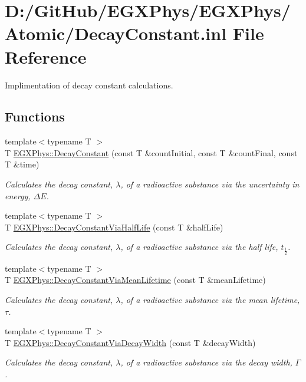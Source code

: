 \hypertarget{_decay_constant_8inl}{}\section{D\+:/\+Git\+Hub/\+E\+G\+X\+Phys/\+E\+G\+X\+Phys/\+Atomic/\+Decay\+Constant.inl File Reference}
\label{_decay_constant_8inl}


Implimentation of decay constant calculations.  


\subsection*{Functions}
\begin{DoxyCompactItemize}
\item 
{\footnotesize template$<$typename T $>$ }\\T \mbox{\hyperlink{group___e_g_x_phys-_decay_constant_ga904edce5aad441b4a0873b3b1a83c7f2}{E\+G\+X\+Phys\+::\+Decay\+Constant}} (const T \&count\+Initial, const T \&count\+Final, const T \&time)
\begin{DoxyCompactList}\small\item\em Calculates the decay constant, $\lambda$, of a radioactive substance via the uncertainty in energy, $\Delta E$. \end{DoxyCompactList}\item 
{\footnotesize template$<$typename T $>$ }\\T \mbox{\hyperlink{group___e_g_x_phys-_decay_constant_ga89c04a655d9e24f976399cc8f173b7aa}{E\+G\+X\+Phys\+::\+Decay\+Constant\+Via\+Half\+Life}} (const T \&half\+Life)
\begin{DoxyCompactList}\small\item\em Calculates the decay constant, $\lambda$, of a radioactive substance via the half life, $t_{\frac{1}{2}}$. \end{DoxyCompactList}\item 
{\footnotesize template$<$typename T $>$ }\\T \mbox{\hyperlink{group___e_g_x_phys-_decay_constant_ga260cf6dc4f926269ea8966c19dfd269f}{E\+G\+X\+Phys\+::\+Decay\+Constant\+Via\+Mean\+Lifetime}} (const T \&mean\+Lifetime)
\begin{DoxyCompactList}\small\item\em Calculates the decay constant, $\lambda$, of a radioactive substance via the mean lifetime, $\tau$. \end{DoxyCompactList}\item 
{\footnotesize template$<$typename T $>$ }\\T \mbox{\hyperlink{group___e_g_x_phys-_decay_constant_gac0dc5d8a75657eaa2e939dd243fe4ba8}{E\+G\+X\+Phys\+::\+Decay\+Constant\+Via\+Decay\+Width}} (const T \&decay\+Width)
\begin{DoxyCompactList}\small\item\em Calculates the decay constant, $\lambda$, of a radioactive substance via the decay width, $\Gamma$. \end{DoxyCompactList}\end{DoxyCompactItemize}


